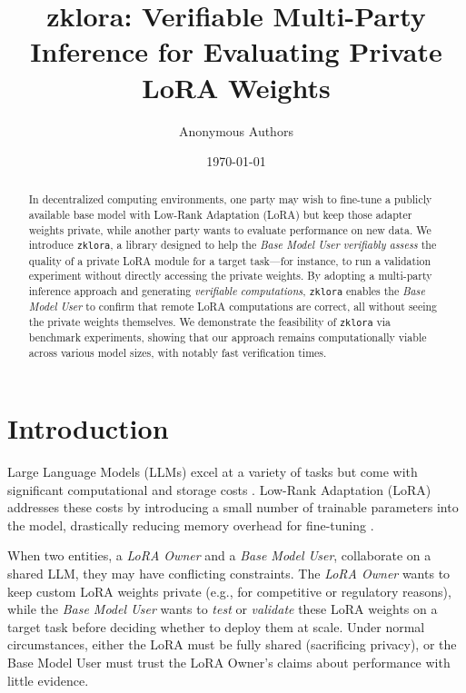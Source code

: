 \documentclass[11pt]{article}
\title{\textbf{zklora: Verifiable Multi-Party Inference for Evaluating Private LoRA Weights}}
\author{Anonymous Authors}
\date{\today}
\begin{document}
\maketitle

\begin{abstract}
In decentralized computing environments, one party may wish to fine-tune a publicly available base model with Low-Rank Adaptation (LoRA) but keep those adapter weights private, while another party wants to evaluate performance on new data. 
We introduce \texttt{zklora}, a library designed to help the \emph{Base Model User} \emph{verifiably assess} the quality of a private LoRA module for a target task---for instance, to run a validation experiment without directly accessing the private weights. 
By adopting a multi-party inference approach and generating \emph{verifiable computations}, \texttt{zklora} enables the \emph{Base Model User} to confirm that remote LoRA computations are correct, all without seeing the private weights themselves. 
We demonstrate the feasibility of \texttt{zklora} via benchmark experiments, showing that our approach remains computationally viable across various model sizes, with notably fast verification times.
\end{abstract}

\section{Introduction}

Large Language Models (LLMs) excel at a variety of tasks but come with significant computational and storage costs \cite{brown2020language, devlin2018bert}. 
Low-Rank Adaptation (LoRA) \cite{hu2021lora} addresses these costs by introducing a small number of trainable parameters into the model, drastically reducing memory overhead for fine-tuning \cite{ding2022delta}. 

When two entities, a \emph{LoRA Owner} and a \emph{Base Model User}, collaborate on a shared LLM, they may have conflicting constraints. The \emph{LoRA Owner} wants to keep custom LoRA weights private (e.g., for competitive or regulatory reasons), while the \emph{Base Model User} wants to \emph{test} or \emph{validate} these LoRA weights on a target task before deciding whether to deploy them at scale. Under normal circumstances, either the LoRA must be fully shared (sacrificing privacy), or the Base Model User must trust the LoRA Owner’s claims about performance with little evidence.
\end{document}

